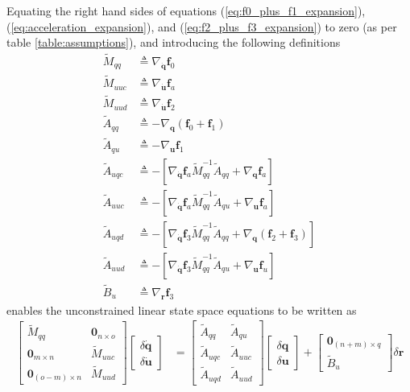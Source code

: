 \documentclass{svjour3}                     %
\begin{document}
Equating the right hand sides of equations (\ref{eq:f0_plus_f1_expansion}),
(\ref{eq:acceleration_expansion}),
and (\ref{eq:f2_plus_f3_expansion}) to zero (as per table
\ref{table:assumptions}), and introducing the following definitions
\begin{align}
\tilde{M}_{qq}  &\triangleq \nabla_{\bm{\dot{q}}}\bm{f}_0 \\
\tilde{M}_{uuc} &\triangleq \nabla_{\bm{\dot{u}}}\bm{f}_a \\
\tilde{M}_{uud} &\triangleq \nabla_{\bm{\dot{u}}}\bm{f}_2 \\
\tilde{A}_{qq}  &\triangleq -\nabla_{\bm{q}}(\bm{f}_0 + \bm{f}_1) \\
\tilde{A}_{qu}  &\triangleq -\nabla_{\bm{u}}\bm{f}_1 \\
\tilde{A}_{uqc} &\triangleq -\left[ \nabla_{\bm{\dot{q}}}\bm{f}_a \tilde{M}_{qq}^{-1} \tilde{A}_{qq} + \nabla_{\bm{q}} \bm{f}_a\right] \\
\tilde{A}_{uuc} &\triangleq -\left[ \nabla_{\bm{\dot{q}}}\bm{f}_a \tilde{M}_{qq}^{-1} \tilde{A}_{qu} + \nabla_{\bm{u}} \bm{f}_a\right] \\
\tilde{A}_{uqd} &\triangleq -\left[ \nabla_{\bm{\dot{q}}}\bm{f}_3 \tilde{M}_{qq}^{-1} \tilde{A}_{qq} + \nabla_{\bm{q}} (\bm{f}_2 + \bm{f}_3)\right] \\
\tilde{A}_{uud} &\triangleq -\left[ \nabla_{\bm{\dot{q}}}\bm{f}_3 \tilde{M}_{qq}^{-1} \tilde{A}_{qu} + \nabla_{\bm{u}} \bm{f}_u\right] \\
\tilde{B}_{u}   &\triangleq \nabla_{\bm{r}}\bm{f}_{3}
\end{align}
enables the unconstrained linear state space equations to be written as
\begin{align}
  \label{eq:state_space_unconstrained}
  \left[
    \begin{array}{cc}
      \tilde{M}_{qq} & \bm{0}_{n \times o} \\
      \bm{0}_{m \times n} & \tilde{M}_{uuc} \\
      \bm{0}_{(o-m) \times n} & \tilde{M}_{uud}
    \end{array}
    \right]
    \left[
      \begin{array}{c}
        \delta \bm{\dot{q}} \\
        \delta \bm{\dot{u}}
      \end{array}
    \right]
   &=
   \left[
     \begin{array}{cc}
       \tilde{A}_{qq} & \tilde{A}_{qu} \\
       \tilde{A}_{uqc} & \tilde{A}_{uuc} \\
       \tilde{A}_{uqd} & \tilde{A}_{uud}
     \end{array}
   \right]
    \left[
      \begin{array}{c}
        \delta \bm{q} \\
        \delta \bm{u}
      \end{array}
    \right]
    +
    \left[
      \begin{array}{c}
        \bm{0}_{(n + m) \times q} \\
        \tilde{B}_{u}
      \end{array}
    \right]
    \delta \bm{r}
\end{align}
\end{document}
